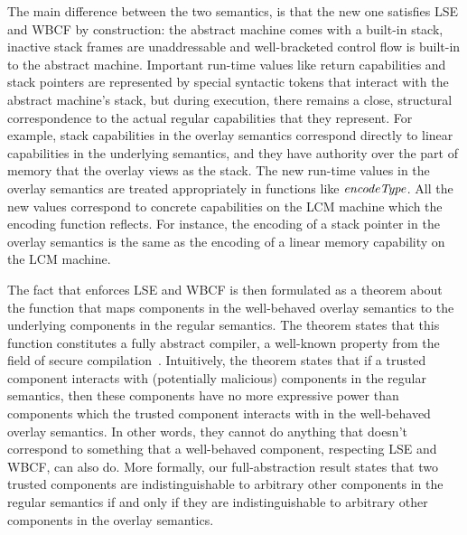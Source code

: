 \documentclass{jfp}
\newcommand{\trgcm}{\textsc{LCM}}
\newenvironment{jversion}{}{}
\begin{document}
The main difference between the two semantics, is that the new one satisfies LSE and WBCF by construction: the abstract machine comes with a built-in stack, inactive stack frames are unaddressable and well-bracketed control flow is built-in to the abstract machine.
Important run-time values like return capabilities and stack pointers are represented by special syntactic tokens that interact with the abstract machine's stack, but during execution, there remains a close, structural correspondence to the actual regular capabilities that they represent.
For example, stack capabilities in the overlay semantics correspond directly to linear capabilities in the underlying semantics, and they have authority over the part of memory that the overlay views as the stack.
\begin{jversion}
The new run-time values in the overlay semantics are treated appropriately in functions like $\encType{}$.
All the new values correspond to concrete capabilities on the \trgcm{} machine which the encoding function reflects.
For instance, the encoding of a stack pointer in the overlay semantics is the same as the encoding of a linear memory capability on the \trgcm{} machine.
\end{jversion}

The fact that \stktokens{} enforces LSE and WBCF is then formulated as a theorem about the function that maps components in the well-behaved overlay semantics to the underlying components in the regular semantics.
The theorem states that this function constitutes a fully abstract compiler, a well-known property from the field of secure compilation~\cite{abadi_protection_1999}.
Intuitively, the theorem states that if a trusted component interacts with (potentially malicious) components in the regular semantics, then these components have no more expressive power than components which the trusted component interacts with in the well-behaved overlay semantics.
In other words, they cannot do anything that doesn't correspond to something that a well-behaved component, respecting LSE and WBCF, can also do.
More formally, our full-abstraction result states that two trusted components are indistinguishable to arbitrary other components in the regular semantics if and only if they are indistinguishable to arbitrary other components in the overlay semantics.
\end{document}

